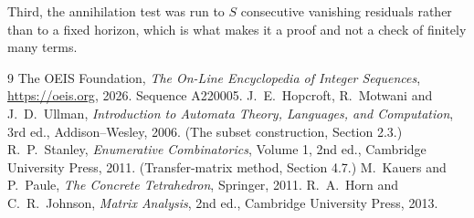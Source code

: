 \documentclass[11pt,a4paper]{article}
\theoremstyle{plain}
\theoremstyle{definition}
\begin{document}
Third, the annihilation test was run to $S$ consecutive vanishing residuals rather than to a
fixed horizon, which is what makes it a proof and not a check of finitely many terms.

\begin{thebibliography}{9}
 The OEIS Foundation, \emph{The On-Line Encyclopedia of Integer
Sequences}, \url{https://oeis.org}, 2026. Sequence A220005.
 J.~E.~Hopcroft, R.~Motwani and J.~D.~Ullman, \emph{Introduction to Automata
Theory, Languages, and Computation}, 3rd ed., Addison--Wesley, 2006. (The subset
construction, Section 2.3.)
 R.~P.~Stanley, \emph{Enumerative Combinatorics}, Volume 1, 2nd ed.,
Cambridge University Press, 2011. (Transfer-matrix method, Section 4.7.)
 M.~Kauers and P.~Paule, \emph{The Concrete Tetrahedron}, Springer, 2011.
 R.~A.~Horn and C.~R.~Johnson, \emph{Matrix Analysis}, 2nd ed., Cambridge
University Press, 2013.
\end{thebibliography}
\end{document}

